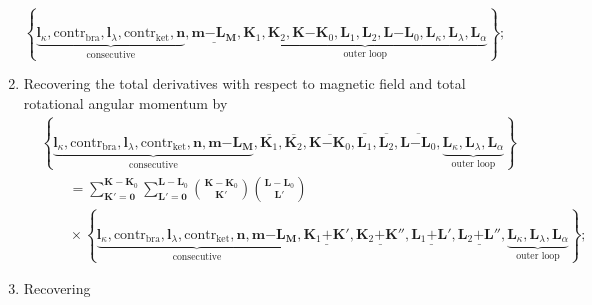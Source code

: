 \documentclass[a4paper,11pt,twoside,openright]{book}
\begin{document}
\begin{enumerate}
\[      \left\{\underbrace{\boldsymbol{l}_{\kappa},\text{contr}_{\text{bra}},\boldsymbol{l}_{\lambda},\text{contr}_{\text{ket}},%
      \boldsymbol{n}}_{\text{consecutive}},\underline{\boldsymbol{m}\mathrm{-}\boldsymbol{L}_{\boldsymbol{M}}},%
      \underbrace{\boldsymbol{K}_{1},\boldsymbol{K}_{2},\boldsymbol{K}\mathrm{-}\boldsymbol{K}_{0},%
      \boldsymbol{L}_{1},\boldsymbol{L}_{2},\boldsymbol{L}\mathrm{-}\boldsymbol{L}_{0},%
      \boldsymbol{L}_{\kappa},\boldsymbol{L}_{\lambda},\boldsymbol{L}_{\alpha}}_{\text{outer loop}}\right\};
    \]
%
  \item Recovering the total derivatives with respect to magnetic field and total rotational angular momentum by
    \begin{align}
      &\left\{\underbrace{\boldsymbol{l}_{\kappa},\text{contr}_{\text{bra}},%
      \boldsymbol{l}_{\lambda},\text{contr}_{\text{ket}},\boldsymbol{n},%
      \boldsymbol{m}\mathrm{-}\boldsymbol{L}_{\boldsymbol{M}}}_{\text{consecutive}},%
      \overline{\boldsymbol{K}_{1}},\overline{\boldsymbol{K}_{2}},%
      \overline{\boldsymbol{K}\mathrm{-}\boldsymbol{K}_{0}},%
      \overline{\boldsymbol{L}_{1}},\overline{\boldsymbol{L}_{2}},%
      \overline{\boldsymbol{L}\mathrm{-}\boldsymbol{L}_{0}},%
      \underbrace{\boldsymbol{L}_{\kappa},\boldsymbol{L}_{\lambda},%
      \boldsymbol{L}_{\alpha}}_{\text{outer loop}}\right\}\nonumber\\
      &\hspace{2em}=\sum_{\boldsymbol{K}'=\boldsymbol{0}}^{\boldsymbol{K}-\boldsymbol{K}_{0}}%
        \sum_{\boldsymbol{L}'=\boldsymbol{0}}^{\boldsymbol{L}-\boldsymbol{L}_{0}}%
        \binom{\boldsymbol{K}-\boldsymbol{K}_{0}}{\boldsymbol{K}'}%
        \binom{\boldsymbol{L}-\boldsymbol{L}_{0}}{\boldsymbol{L}'}\nonumber\\
      &\hspace{2em}\times\left\{\underbrace{\boldsymbol{l}_{\kappa},\text{contr}_{\text{bra}},%
      \boldsymbol{l}_{\lambda},\text{contr}_{\text{ket}},\boldsymbol{n},%
      \boldsymbol{m}\mathrm{-}\boldsymbol{L}_{\boldsymbol{M}}}_{\text{consecutive}},%
      \underline{\boldsymbol{K}_{1}\mathrm{+}\boldsymbol{K}'},%
      \underline{\boldsymbol{K}_{2}\mathrm{+}\boldsymbol{K}''},%
      \underline{\boldsymbol{L}_{1}\mathrm{+}\boldsymbol{L}'},%
      \underline{\boldsymbol{L}_{2}\mathrm{+}\boldsymbol{L}''},
      \underbrace{\boldsymbol{L}_{\kappa},\boldsymbol{L}_{\lambda},%
      \boldsymbol{L}_{\alpha}}_{\text{outer loop}}\right\};\nonumber
    \end{align}
%
  \item Recovering

\end{enumerate}
\end{document}
